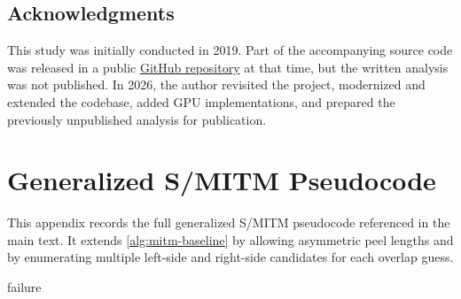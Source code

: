 \documentclass[version=preprint]{iacrcc}
\begin{document}
\makeatletter
\if@anonymous\else
\subsection*{Acknowledgments}
This study was initially conducted in 2019.
Part of the accompanying source code was released in a public \href{https://github.com/hadipourh/KeeLoq}{GitHub repository} at that time, but the written analysis was not published.
In 2026, the author revisited the project, modernized and extended the codebase, added GPU implementations, and prepared the previously unpublished analysis for publication.
\fi
\makeatother



\clearpage

\appendix

\section{Generalized S/MITM Pseudocode}\label{app:mitm-general}

This appendix records the full generalized S/MITM pseudocode referenced in the main text.
It extends \autoref{alg:mitm-baseline} by allowing asymmetric peel lengths and by enumerating multiple left-side and right-side candidates for each overlap guess.

\begin{algorithm}[htbp]
\caption{Generalized S/MITM attack (profile $t_p,t_c,t_o$)}\label{alg:mitm-general}
\SetAlgoLined
{}
\Return failure\;
\end{algorithm}
\end{document}
